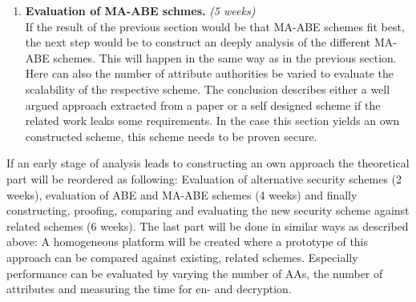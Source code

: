 \documentclass[twocolumn]{article}
\begin{document}
\begin{enumerate}
	\item\textbf{Evaluation of MA-ABE schmes.} \textit{(5 weeks)} \\  
		  If the result of the previous section would be that MA-ABE schemes fit best, the next step would be to construct an deeply analysis of the different MA-ABE schemes. This will happen in the same way as in the previous section. Here can also the number of attribute authorities be varied to evaluate the scalability of the respective scheme. 
		  The conclusion describes either a well argued approach extracted from a paper or a self designed scheme if the related work leaks some requirements. In the case this section yields an own constructed scheme, this scheme needs to be proven secure.  
\end{enumerate}
If an early stage of analysis leads to constructing an own approach the theoretical part will be reordered as following: Evaluation of alternative security schemes (2 weeks), evaluation of ABE and MA-ABE schemes (4 weeks) and finally constructing, proofing, comparing and evaluating the new security scheme against related schemes (6 weeks). 
The last part will be done in similar ways as described above: A homogeneous platform will be created where a prototype of this approach can be compared against existing, related schemes. Especially performance can be evaluated by varying the number of AAs, the number of attributes and measuring the time for en- and decryption.  \\
\end{document}
